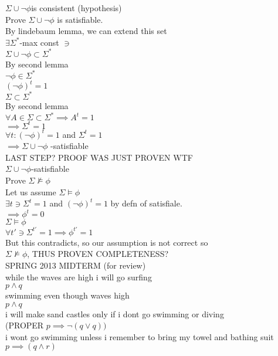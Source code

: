 \documentclass[12pt,oneside,fleqn]{article}
\theoremstyle{definition}
\begin{document}
$\Sigma \cup { \neg \phi}$is consistent (hypothesis) \\
Prove $\Sigma \cup { \neg \phi}$ is satisfiable. \\
By lindebaum lemma, we can extend this set \\
$\exists \Sigma^*$-max const $\ni$  \\
$\Sigma \cup { \neg \phi } \subset \Sigma^*$ \\
By second lemma \\
$\neg \phi \in \Sigma^*$ \\
$(\neg \phi)^t = 1$ \\
$\Sigma \subset \Sigma^*$ \\
By second lemma \\
$\forall A \in \Sigma \subset \Sigma^* \implies A^t = 1$ \\
$\implies \Sigma^t = 1$ \\
$\forall t: (\neg \phi)^t =1 $ and $ \Sigma^t = 1$ \\
$\implies \Sigma \cup { \neg \phi}$ -satisfiable \\
LAST STEP? PROOF WAS JUST PROVEN WTF \\
$\Sigma \cup { \neg \phi}$-satisfiable \\
Prove $\Sigma \not \vDash \phi$ \\
Let us assume $\Sigma \vDash \phi$ \\
$\exists t  \ni \Sigma^t = 1 $ and $(\neg \phi)^t = 1$ by defn of satisfiale. \\
$\implies \phi^t = 0$ \\
$\Sigma \vDash \phi$ \\
$\forall t' \ni \Sigma^{t'} = 1 \implies \phi^{t'} = 1$  \\
But this contradicts, so our assumption is not correct so \\
$\Sigma \not \vDash \phi$, THUS PROVEN COMPLETENESS? \\


SPRING 2013 MIDTERM (for review) \\

while the waves are high i will go surfing \\
$p \land q$ \\
swimming even though waves high \\

$p \land q$ \\ 
i will make sand castles only if i dont go swimming or diving \\
(PROPER $p \implies \neg (q \lor q))$ \\
i wont go swimming unless i remember to bring my towel and bathing suit \\
$p \implies (q \land r)$ \\
\end{document}

